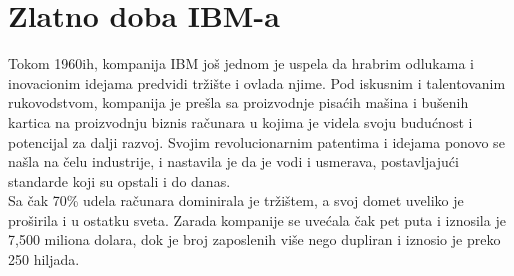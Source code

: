\documentclass[a4paper]{article}
\begin{document}
\section{Zlatno doba IBM-a}
Tokom 1960ih, kompanija IBM još jednom je uspela da hrabrim odlukama i inovacionim idejama predvidi tržište i ovlada njime. Pod iskusnim i talentovanim rukovodstvom, kompanija je prešla sa proizvodnje pisaćih mašina i bušenih kartica na proizvodnju biznis računara u kojima je videla svoju budućnost i potencijal za dalji razvoj.%
Svojim revolucionarnim patentima i idejama ponovo se našla na čelu industrije, i nastavila je da je vodi i usmerava, postavljajući standarde koji su opstali i do danas.\\%
Sa čak 70\% udela računara dominirala je tržištem, a svoj domet uveliko je proširila i u ostatku sveta. Zarada kompanije se uvećala čak pet puta i iznosila je 7,500 miliona dolara, dok je broj zaposlenih više nego dupliran i iznosio je preko 250 hiljada.\\
\end{document}
